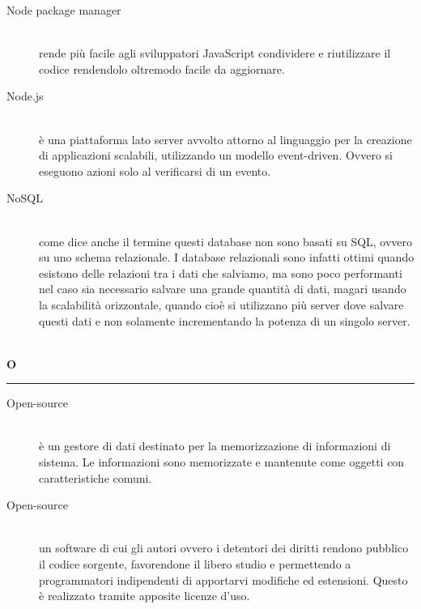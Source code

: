 \documentclass[12pt,a4paper]{article}
\begin{document}
\begin{description}

\item[Node package manager] 
\hfill\\ rende più facile agli sviluppatori JavaScript condividere e riutilizzare il codice rendendolo oltremodo facile da aggiornare.

\item[Node.js] 
\hfill\\ è una piattaforma lato server avvolto attorno al linguaggio  per la creazione di applicazioni scalabili, utilizzando un modello event-driven. Ovvero si eseguono azioni solo al verificarsi di un evento.

\item[NoSQL] 
\hfill\\ come dice anche il termine questi database non sono basati su SQL, ovvero su uno schema relazionale. I database relazionali sono infatti ottimi quando esistono delle relazioni tra i dati che salviamo, ma sono poco performanti nel caso sia necessario salvare una grande quantità di dati, magari usando la scalabilità orizzontale, quando cioè si utilizzano più server dove salvare questi dati e non solamente incrementando la potenza di un singolo server.
\end{description}

\newpage

\begin{center}
\hfill\\
	\LARGE \textbf{O}
\hfill\\
\rule[15pt]{30pt}{0.5pt}
\end{center}

\begin{description}

\item[Open-source] 
\hfill\\è un gestore di dati destinato per la memorizzazione di informazioni di sistema. Le informazioni sono memorizzate e mantenute come oggetti con caratteristiche comuni.

\item[Open-source] 
\hfill\\ un software di cui gli autori ovvero i detentori dei diritti rendono pubblico il codice sorgente, favorendone il libero studio e permettendo a programmatori indipendenti di apportarvi modifiche ed estensioni. Questo è realizzato tramite apposite licenze d'uso.
\end{description}
\end{document}
